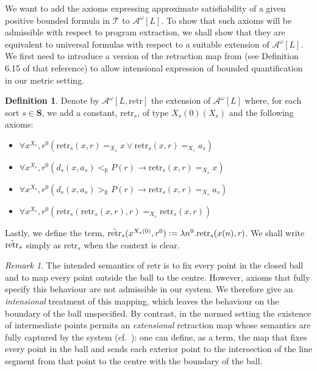 \documentclass[11pt]{amsart}
\theoremstyle{definition}
\newtheorem{definition}[theorem]{Definition}
\theoremstyle{remark}
\newtheorem{remark}[theorem]{Remark}
\def\RR{\mathbb{R}}
\begin{document}
We want to add the axioms expressing approximate satisfiability of a given positive bounded formula in $\mathcal{T}$ to $\mathcal{A}^\omega[L]$. To show that such axioms will be admissible with respect to program extraction, we shall show that they are equivalent to universal formulas with respect to a suitable extension of  $\mathcal{A}^\omega[L]$. We first need to introduce a version of the retraction map from \cite{GuK2016} (see Definition 6.15 of that reference) to allow intensional expression of bounded quantification in our metric setting.
\begin{definition}
\label{def:retr}
Denote by $\mathcal{A}^\omega[L,\mathrm{retr}]$ the extension of $\mathcal{A}^\omega[L]$ where, for each sort $s\in \mathbf{S}$, we add a constant, $\mathrm{retr}_s$, of type $X_s(0)(X_s)$ and the following axioms:
\begin{itemize}
    \item $\forall x^{X_s}, r^0(\mathrm{retr}_s(x,r) =_{X_s} x \lor \mathrm{retr}_s(x,r) =_{X_s}  a_{s})$
    \item $\forall x^{X_s}, r^0(d_s(x,a_s)<_\RR P(r) \to \mathrm{retr}_s(x,r) =_{X_s}  x)$
    \item $\forall x^{X_s}, r^0(   d_s(x,a_{s})>_{\RR} P(r) \to \mathrm{retr}_s(x,r) =_{X_s}  a_{s} )$
    \item $\forall x^{X_s}, r^0(\mathrm{retr}_s(\mathrm{retr}_s(x,r),r) =_{X_s} \mathrm{retr}_s(x,r))$
\end{itemize}

Lastly, we define the term, $\Tilde{\mathrm{retr}}_s(x^{X_s(0)},r^0):= \lambda n^0.\mathrm{retr}_s(x(n),r)$.
We shall write $ \Tilde{\mathrm{retr}}_s$ simply as $\mathrm{retr}_s$ when the context is clear.
\end{definition}
\begin{remark}
\label{rem:retr}
The intended semantics of $\mathrm{retr}$ is to fix every point in the closed
ball and to map every point outside the ball to the centre. However, axioms
that fully specify this behaviour are not admissible in our system. We
therefore give an \emph{intensional} treatment of this mapping, which leaves
the behaviour on the boundary of the ball unspecified. By contrast, in the normed setting the existence of intermediate points permits
an \emph{extensional} retraction map whose semantics are fully captured by the
system (cf.\ \cite[Definition 6.15]{GuK2016}): one can define, as a term, the map that fixes every point in the ball
and sends each exterior point to the intersection of the line segment from that
point to the centre with the boundary of the ball.
\end{remark}
\end{document}
